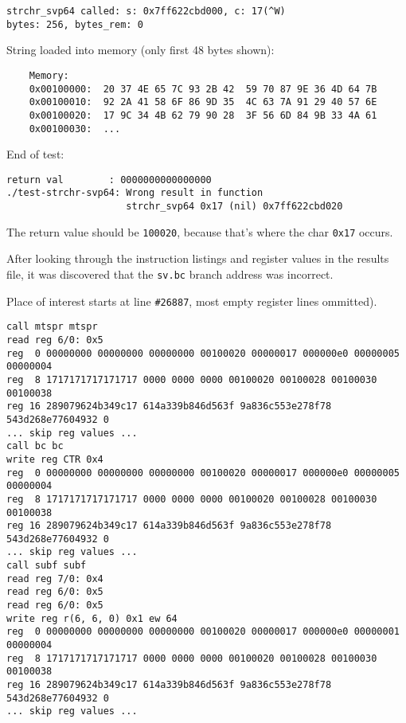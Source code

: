 \begin{verbatim}
strchr_svp64 called: s: 0x7ff622cbd000, c: 17(^W)
bytes: 256, bytes_rem: 0
\end{verbatim}

String loaded into memory (only first 48 bytes shown):

\begin{verbatim}
    Memory:
    0x00100000:  20 37 4E 65 7C 93 2B 42  59 70 87 9E 36 4D 64 7B
    0x00100010:  92 2A 41 58 6F 86 9D 35  4C 63 7A 91 29 40 57 6E
    0x00100020:  17 9C 34 4B 62 79 90 28  3F 56 6D 84 9B 33 4A 61
    0x00100030:  ...
\end{verbatim}

End of test:

\begin{verbatim}
return val        : 0000000000000000
./test-strchr-svp64: Wrong result in function
                     strchr_svp64 0x17 (nil) 0x7ff622cbd020
\end{verbatim}

The return value should be \texttt{100020}, because that's where
the char \texttt{0x17} occurs.

After looking through the instruction listings and register values in the
results file, it was discovered that the \texttt{sv.bc} branch address
was incorrect.

Place of interest starts at line \texttt{\#26887}, most empty register
lines ommitted).

\begin{verbatim}
call mtspr mtspr
read reg 6/0: 0x5
reg  0 00000000 00000000 00000000 00100020 00000017 000000e0 00000005 00000004
reg  8 1717171717171717 0000 0000 0000 00100020 00100028 00100030 00100038
reg 16 289079624b349c17 614a339b846d563f 9a836c553e278f78 543d268e77604932 0
... skip reg values ...
call bc bc
write reg CTR 0x4
reg  0 00000000 00000000 00000000 00100020 00000017 000000e0 00000005 00000004
reg  8 1717171717171717 0000 0000 0000 00100020 00100028 00100030 00100038
reg 16 289079624b349c17 614a339b846d563f 9a836c553e278f78 543d268e77604932 0
... skip reg values ...
call subf subf
read reg 7/0: 0x4
read reg 6/0: 0x5
read reg 6/0: 0x5
write reg r(6, 6, 0) 0x1 ew 64
reg  0 00000000 00000000 00000000 00100020 00000017 000000e0 00000001 00000004
reg  8 1717171717171717 0000 0000 0000 00100020 00100028 00100030 00100038
reg 16 289079624b349c17 614a339b846d563f 9a836c553e278f78 543d268e77604932 0
... skip reg values ...
\end{verbatim}

